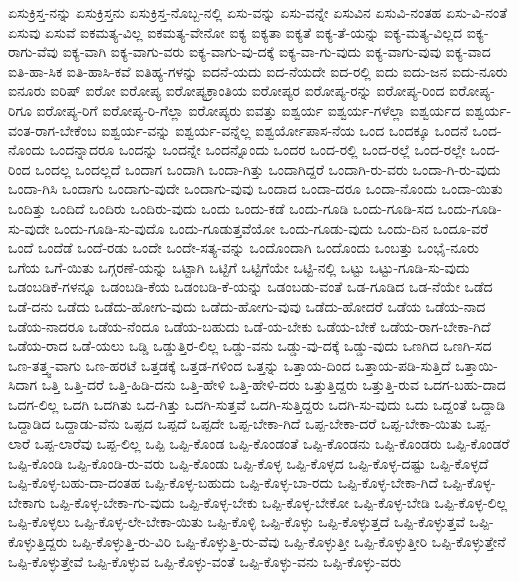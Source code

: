 {ಏಸುಕ್ರಿಸ್ತ-ನನ್ನು
ಏಸುಕ್ರಿಸ್ತನು
ಏಸುಕ್ರಿಸ್ತ-ನೊಬ್ಬ-ನಲ್ಲಿ
ಏಸು-ವನ್ನು
ಏಸು-ವನ್ನೇ
ಏಸುವಿನ
ಏಸುವಿ-ನಂತಹ
ಏಸು-ವಿ-ನಂತೆ
ಏಸುವು
ಏಸುವೆ
ಐಕಮತ್ಯ-ವಿಲ್ಲ
ಐಕಮತ್ಯ-ವೇನೋ
ಐಕ್ಯ
ಐಕ್ಯತಾ
ಐಕ್ಯತೆ
ಐಕ್ಯ-ತೆ-ಯನ್ನು
ಐಕ್ಯ-ಮತ್ಯ-ವಿಲ್ಲದ
ಐಕ್ಯ-ರಾಗು-ವೆವು
ಐಕ್ಯ-ವಾಗಿ
ಐಕ್ಯ-ವಾಗು-ವರು
ಐಕ್ಯ-ವಾಗು-ವು-ದಕ್ಕೆ
ಐಕ್ಯ-ವಾ-ಗು-ವುದು
ಐಕ್ಯ-ವಾಗು-ವುವು
ಐಕ್ಯ-ವಾದ
ಐತಿ-ಹಾ-ಸಿಕ
ಐತಿ-ಹಾಸಿ-ಕವೆ
ಐತಿಹ್ಯ-ಗಳನ್ನು
ಐದನೆ-ಯದು
ಐದ-ನೆಯದೇ
ಐದ-ರಲ್ಲಿ
ಐದು
ಐದು-ಜನ
ಐದು-ನೂರು
ಐನೂರು
ಐರಿಷ್
ಐರೋ
ಐರೋಪ್ಯ
ಐರೋಪ್ಯಕ್ರಾಂತಿಯ
ಐರೋಪ್ಯರ
ಐರೋಪ್ಯ-ರನ್ನು
ಐರೋಪ್ಯ-ರಿಂದ
ಐರೋಪ್ಯ-ರಿಗೂ
ಐರೋಪ್ಯ-ರಿಗೆ
ಐರೋಪ್ಯ-ರಿ-ಗೆಲ್ಲಾ
ಐರೋಪ್ಯರು
ಐವತ್ತು
ಐಶ್ವರ್ಯ
ಐಶ್ವರ್ಯ-ಗಳೆಲ್ಲಾ
ಐಶ್ವರ್ಯದ
ಐಶ್ವರ್ಯ-ವಂತ-ರಾಗ-ಬೇಕೆಂಬ
ಐಶ್ವರ್ಯ-ವನ್ನು
ಐಶ್ವರ್ಯ-ವನ್ನೆಲ್ಲ
ಐಶ್ವರ್ಯೋಪಾಸ-ನೆಯ
ಒಂದ
ಒಂದಕ್ಕೂ
ಒಂದನೆ
ಒಂದ-ನೊಂದು
ಒಂದನ್ನಾದರೂ
ಒಂದನ್ನು
ಒಂದನ್ನೇ
ಒಂದನ್ನೊಂದು
ಒಂದರ
ಒಂದ-ರಲ್ಲಿ
ಒಂದ-ರಲ್ಲೆ
ಒಂದ-ರಲ್ಲೇ
ಒಂದ-ರಿಂದ
ಒಂದಲ್ಲ
ಒಂದಲ್ಲದೆ
ಒಂದಾಗ
ಒಂದಾಗಿ
ಒಂದಾ-ಗಿತ್ತು
ಒಂದಾಗಿದ್ದರೆ
ಒಂದಾಗಿ-ರು-ವರು
ಒಂದಾ-ಗಿ-ರು-ವುದು
ಒಂದಾ-ಗಿಸಿ
ಒಂದಾಗು
ಒಂದಾಗು-ವುದೇ
ಒಂದಾಗು-ವುವು
ಒಂದಾದ
ಒಂದಾ-ದರೂ
ಒಂದಾ-ನೊಂದು
ಒಂದಾ-ಯಿತು
ಒಂದಿತ್ತು
ಒಂದಿದೆ
ಒಂದಿರು
ಒಂದಿರು-ವುದು
ಒಂದು
ಒಂದು-ಕಡೆ
ಒಂದು-ಗೂಡಿ
ಒಂದು-ಗೂಡಿ-ಸದ
ಒಂದು-ಗೂಡಿ-ಸು-ವುದೇ
ಒಂದು-ಗೂಡಿ-ಸು-ವುದೊ
ಒಂದು-ಗೂಡುತ್ತವೆಯೋ
ಒಂದು-ಗೂಡು-ವುದು
ಒಂದು-ದಿನ
ಒಂದೂ-ವರೆ
ಒಂದೆ
ಒಂದೆಡೆ
ಒಂದೆ-ರಡು
ಒಂದೇ
ಒಂದೇ-ಸತ್ಯ-ವನ್ನು
ಒಂದೊಂದಾಗಿ
ಒಂದೊಂದು
ಒಂಬತ್ತು
ಒಂಭೈ-ನೂರು
ಒಗೆಯ
ಒಗೆ-ಯಿತು
ಒಗ್ಗರಣೆ-ಯನ್ನು
ಒಟ್ಟಾಗಿ
ಒಟ್ಟಿಗೆ
ಒಟ್ಟಿಗೆಯೇ
ಒಟ್ಟಿ-ನಲ್ಲಿ
ಒಟ್ಟು
ಒಟ್ಟು-ಗೂಡಿ-ಸು-ವುದು
ಒಡಂಬಡಿಕೆ-ಗಳನ್ನೂ
ಒಡಂಬಡಿ-ಕೆಯ
ಒಡಂಬಡಿ-ಕೆ-ಯನ್ನು
ಒಡಂಬಡು-ವಂತೆ
ಒಡ-ಗೂಡಿದ
ಒಡ-ನೆಯೇ
ಒಡೆದ
ಒಡೆ-ದನು
ಒಡೆದು
ಒಡೆದು-ಹೋಗು-ವುದು
ಒಡೆದು-ಹೋಗು-ವುವು
ಒಡೆದು-ಹೋದರೆ
ಒಡೆಯ
ಒಡೆಯ-ನಾದ
ಒಡೆಯ-ನಾದರೂ
ಒಡೆಯ-ನೆಂದೂ
ಒಡೆಯ-ಬಹುದು
ಒಡೆ-ಯ-ಬೇಕು
ಒಡೆಯ-ಬೇಕೆ
ಒಡೆಯ-ರಾಗ-ಬೇಕಾ-ಗಿದೆ
ಒಡೆಯ-ರಾದ
ಒಡೆ-ಯಲು
ಒಡ್ಡಿ
ಒಡ್ಡುತ್ತಿರ-ಲಿಲ್ಲ
ಒಡ್ಡು-ವನು
ಒಡ್ಡು-ವು-ದಕ್ಕೆ
ಒಡ್ಡು-ವುದು
ಒಣಗಿದ
ಒಣಗಿ-ಸದ
ಒಣ-ತತ್ತ್ವ-ವಾಗು
ಒಣ-ಹರಟೆ
ಒತ್ತಡಕ್ಕೆ
ಒತ್ತಡ-ಗಳಿಂದ
ಒತ್ತನ್ನು
ಒತ್ತಾಯ-ದಿಂದ
ಒತ್ತಾಯ-ಪಡಿ-ಸುತ್ತಿದೆ
ಒತ್ತಾಯಿ-ಸಿದಾಗ
ಒತ್ತಿ
ಒತ್ತಿ-ದರೆ
ಒತ್ತಿ-ಹಿಡಿ-ದನು
ಒತ್ತಿ-ಹೇಳಿ
ಒತ್ತಿ-ಹೇಳಿ-ದರು
ಒತ್ತುತ್ತಿದ್ದರು
ಒತ್ತುತ್ತಿ-ರುವ
ಒದಗ-ಬಹು-ದಾದ
ಒದಗ-ಲಿಲ್ಲ
ಒದಗಿ
ಒದಗಿತು
ಒದ-ಗಿತ್ತು
ಒದಗಿ-ಸುತ್ತವೆ
ಒದಗಿ-ಸುತ್ತಿದ್ದರು
ಒದಗಿ-ಸು-ವುದು
ಒದು
ಒದ್ದಂತೆ
ಒದ್ದಾಡಿ
ಒದ್ದಾಡಿದ
ಒದ್ದಾಡು-ವೆನು
ಒಪ್ಪದ
ಒಪ್ಪದೆ
ಒಪ್ಪದೇ
ಒಪ್ಪ-ಬೇಕಾ-ಗಿದೆ
ಒಪ್ಪ-ಬೇಕಾ-ದರೆ
ಒಪ್ಪ-ಬೇಕಾ-ಯಿತು
ಒಪ್ಪ-ಲಾರೆ
ಒಪ್ಪ-ಲಾರೆವು
ಒಪ್ಪ-ಲಿಲ್ಲ
ಒಪ್ಪಿ
ಒಪ್ಪಿ-ಕೊಂಡ
ಒಪ್ಪಿ-ಕೊಂಡಂತೆ
ಒಪ್ಪಿ-ಕೊಂಡನು
ಒಪ್ಪಿ-ಕೊಂಡರು
ಒಪ್ಪಿ-ಕೊಂಡರೆ
ಒಪ್ಪಿ-ಕೊಂಡಿ
ಒಪ್ಪಿ-ಕೊಂಡಿ-ರು-ವರು
ಒಪ್ಪಿ-ಕೊಂಡು
ಒಪ್ಪಿ-ಕೊಳ್ಳ
ಒಪ್ಪಿ-ಕೊಳ್ಳದ
ಒಪ್ಪಿ-ಕೊಳ್ಳ-ದಷ್ಟು
ಒಪ್ಪಿ-ಕೊಳ್ಳದೆ
ಒಪ್ಪಿ-ಕೊಳ್ಳ-ಬಹು-ದಾ-ದಂತಹ
ಒಪ್ಪಿ-ಕೊಳ್ಳ-ಬಹುದು
ಒಪ್ಪಿ-ಕೊಳ್ಳ-ಬಾ-ರದು
ಒಪ್ಪಿ-ಕೊಳ್ಳ-ಬೇಕಾ-ಗಿದೆ
ಒಪ್ಪಿ-ಕೊಳ್ಳ-ಬೇಕಾಗು
ಒಪ್ಪಿ-ಕೊಳ್ಳ-ಬೇಕಾ-ಗು-ವುದು
ಒಪ್ಪಿ-ಕೊಳ್ಳ-ಬೇಕು
ಒಪ್ಪಿ-ಕೊಳ್ಳ-ಬೇಕೋ
ಒಪ್ಪಿ-ಕೊಳ್ಳ-ಬೇಡಿ
ಒಪ್ಪಿ-ಕೊಳ್ಳ-ಲಿಲ್ಲ
ಒಪ್ಪಿ-ಕೊಳ್ಳಲು
ಒಪ್ಪಿ-ಕೊಳ್ಳ-ಲೇ-ಬೇಕಾ-ಯಿತು
ಒಪ್ಪಿ-ಕೊಳ್ಳಿ
ಒಪ್ಪಿ-ಕೊಳ್ಳು
ಒಪ್ಪಿ-ಕೊಳ್ಳುತ್ತದೆ
ಒಪ್ಪಿ-ಕೊಳ್ಳುತ್ತವೆ
ಒಪ್ಪಿ-ಕೊಳ್ಳುತ್ತಿದ್ದರು
ಒಪ್ಪಿ-ಕೊಳ್ಳುತ್ತಿ-ರು-ವಿರಿ
ಒಪ್ಪಿ-ಕೊಳ್ಳುತ್ತಿ-ರು-ವೆವು
ಒಪ್ಪಿ-ಕೊಳ್ಳುತ್ತೀ
ಒಪ್ಪಿ-ಕೊಳ್ಳುತ್ತೀರಿ
ಒಪ್ಪಿ-ಕೊಳ್ಳುತ್ತೇನೆ
ಒಪ್ಪಿ-ಕೊಳ್ಳುತ್ತೇವೆ
ಒಪ್ಪಿ-ಕೊಳ್ಳುವ
ಒಪ್ಪಿ-ಕೊಳ್ಳು-ವಂತೆ
ಒಪ್ಪಿ-ಕೊಳ್ಳು-ವನು
ಒಪ್ಪಿ-ಕೊಳ್ಳು-ವರು
}
